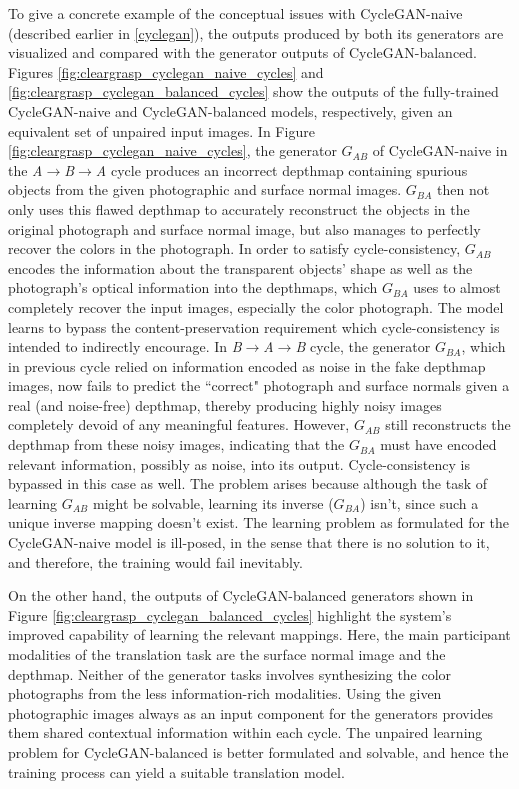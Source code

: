 To give a concrete example of the conceptual issues with CycleGAN-naive (described earlier in \ref{cyclegan}), the outputs produced by both its generators are visualized and compared with the generator outputs of CycleGAN-balanced. Figures \ref{fig:cleargrasp_cyclegan_naive_cycles} and \ref{fig:cleargrasp_cyclegan_balanced_cycles} show the outputs of the fully-trained CycleGAN-naive and CycleGAN-balanced models, respectively, given an equivalent set of unpaired input images. In Figure \ref{fig:cleargrasp_cyclegan_naive_cycles}, the generator $G_{AB}$ of CycleGAN-naive in the \textit{A}$\rightarrow$\textit{B}$\rightarrow$\textit{A} cycle produces an incorrect depthmap containing spurious objects from the given photographic and surface normal images. $G_{BA}$ then not only uses this flawed depthmap to accurately reconstruct the objects in the original photograph and surface normal image, but also manages to perfectly recover the colors in the photograph. In order to satisfy cycle-consistency, $G_{AB}$ encodes the information about the transparent objects' shape as well as the photograph's optical information into the depthmaps, which $G_{BA}$ uses to almost completely recover the input images, especially the color photograph. The model learns to bypass the content-preservation requirement which cycle-consistency is intended to indirectly encourage. In \textit{B}$\rightarrow$\textit{A}$\rightarrow$\textit{B} cycle, the generator $G_{BA}$, which in previous cycle relied on information encoded as noise in the fake depthmap images, now fails to predict the ``correct" photograph and surface normals given a real (and noise-free) depthmap, thereby producing highly noisy images completely devoid of any meaningful features. However, $G_{AB}$ still reconstructs the depthmap from these noisy images, indicating that the $G_{BA}$ must have encoded relevant information, possibly as noise, into its output. Cycle-consistency is bypassed in this case as well. The problem arises because although the task of learning $G_{AB}$ might be solvable, learning its inverse ($G_{BA}$) isn't, since such a unique inverse mapping doesn't exist. The learning problem as formulated for the CycleGAN-naive model is ill-posed, in the sense that there is no solution to it, and therefore, the training would fail inevitably. 

On the other hand, the outputs of CycleGAN-balanced generators shown in Figure \ref{fig:cleargrasp_cyclegan_balanced_cycles} highlight the system's improved capability of learning the relevant mappings. Here, the main participant modalities of the translation task are the surface normal image and the depthmap. Neither of the generator tasks involves synthesizing the color photographs from the less information-rich modalities. Using the given photographic images always as an input component for the generators provides them shared contextual information within each cycle. The unpaired learning problem for CycleGAN-balanced is better formulated and solvable, and hence the training process can yield a suitable translation model.



